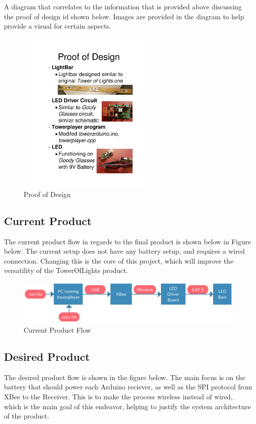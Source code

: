 \documentclass[12pt]{article}
\begin{document}
{{{{			A diagram that correlates to the information that is provided above discussing the proof of design id shown below. Images are provided in the diagram to help provide a visual for certain aspects.
			
			\begin{figure}[!htb]
				\centering
				\includegraphics[width = 70mm, height = 80mm]{assets/Proof_Of_Design.png}
				\caption{Proof of Design \label{overflow}}
			\end{figure}
			
				
		\subsection{Current Product}
			The current product flow in regards to the final product is shown below in Figure below. The current setup does not have any battery setup, and requires a wired connection. Changing this is the core of this project, which will improve the versatility of the TowerOfLights product.
			
			\begin{figure}[ht!]
				\centering
				\includegraphics[width=170mm]{assets/What_We_Have.png}
				\caption{Current Product Flow \label{overflow}}
			\end{figure}
		
		
		\subsection{Desired Product}
			The desired product flow is shown in the figure below. The main focus is on the battery that should power each Arduino reciever, as well as the SPI protocol from XBee to the Receiver. This is to make the process wireless instead of wired, which is the main goal of this endeavor, helping to justify the system architecture of the product.
			
}}}}
\end{document}
